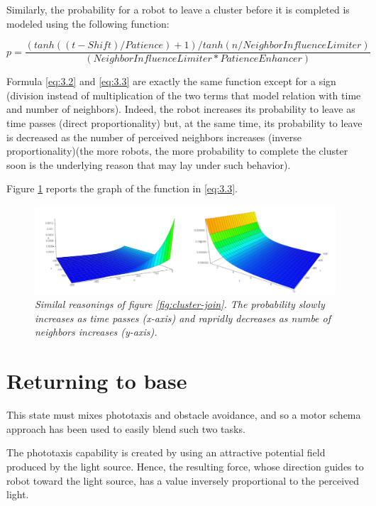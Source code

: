 Similarly, the probability for a robot to leave a cluster before it is completed is modeled using the following function:

\begin{equation}
    p =  \frac{(tanh((t - Shift) / Patience) + 1) / tanh(n / NeighborInfluenceLimiter)}{(NeighborInfluenceLimiter * PatienceEnhancer)} \tag{3.3}\label{eq:3.3}
\end{equation}

Formula \ref{eq:3.2} and \ref{eq:3.3} are exactly the same function except for a sign (division instead of multiplication of the two terms that model relation with time and number of neighbors). Indeed, the robot increases its probability to leave as time passes (direct proportionality) but, at the same time, its probability to leave is decreased as the number of perceived neighbors increases (inverse proportionality)(the more robots, the more probability to complete the cluster soon is the underlying reason that may lay under such behavior). 

\noindent
Figure \ref{fig:cluster-leave} reports the graph of the function in \ref{eq:3.3}.

\begin{figure}[H]
\centering
\includegraphics[width=\linewidth]{images/cluster_leave.png}
\caption{\textit{Similal reasonings of figure \ref{fig:cluster-join}. The probability slowly increases as time passes (x-axis) and rapridly decreases as numbe of neighbors increases (y-axis).}}
\label{fig:cluster-leave}
\end{figure}

\section{Returning to base}

This state must mixes phototaxis and obstacle avoidance, and so a motor schema approach has been used to easily blend such two tasks.

\smallskip
The phototaxis capability is created by using an attractive potential field produced by the light source. Hence, the resulting force, whose direction guides to robot toward the light source, has a value inversely proportional to the perceived light.

